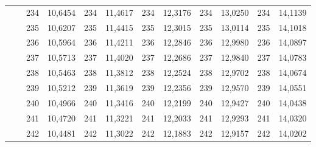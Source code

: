 \documentclass[a4paper,12pt]{article} %
\begin{document}
\begin{longtable}[c]{cccccccccc|c|c|}
	& \multicolumn{1}{c|}{} & \multicolumn{1}{c|}{234} & \multicolumn{1}{c|}{10,6454} & \multicolumn{1}{c|}{234} & \multicolumn{1}{c|}{11,4617} & \multicolumn{1}{c|}{234} & \multicolumn{1}{c|}{12,3176} & \multicolumn{1}{c|}{234} & 13,0250 & 234 & 14,1139 \\ \cline{3-12} 
	& \multicolumn{1}{c|}{} & \multicolumn{1}{c|}{235} & \multicolumn{1}{c|}{10,6207} & \multicolumn{1}{c|}{235} & \multicolumn{1}{c|}{11,4415} & \multicolumn{1}{c|}{235} & \multicolumn{1}{c|}{12,3015} & \multicolumn{1}{c|}{235} & 13,0114 & 235 & 14,1018 \\ \cline{3-12} 
	& \multicolumn{1}{c|}{} & \multicolumn{1}{c|}{236} & \multicolumn{1}{c|}{10,5964} & \multicolumn{1}{c|}{236} & \multicolumn{1}{c|}{11,4211} & \multicolumn{1}{c|}{236} & \multicolumn{1}{c|}{12,2846} & \multicolumn{1}{c|}{236} & 12,9980 & 236 & 14,0897 \\ \cline{3-12} 
	& \multicolumn{1}{c|}{} & \multicolumn{1}{c|}{237} & \multicolumn{1}{c|}{10,5713} & \multicolumn{1}{c|}{237} & \multicolumn{1}{c|}{11,4020} & \multicolumn{1}{c|}{237} & \multicolumn{1}{c|}{12,2686} & \multicolumn{1}{c|}{237} & 12,9840 & 237 & 14,0783 \\ \cline{3-12} 
	& \multicolumn{1}{c|}{} & \multicolumn{1}{c|}{238} & \multicolumn{1}{c|}{10,5463} & \multicolumn{1}{c|}{238} & \multicolumn{1}{c|}{11,3812} & \multicolumn{1}{c|}{238} & \multicolumn{1}{c|}{12,2524} & \multicolumn{1}{c|}{238} & 12,9702 & 238 & 14,0674 \\ \cline{3-12} 
	& \multicolumn{1}{c|}{} & \multicolumn{1}{c|}{239} & \multicolumn{1}{c|}{10,5212} & \multicolumn{1}{c|}{239} & \multicolumn{1}{c|}{11,3619} & \multicolumn{1}{c|}{239} & \multicolumn{1}{c|}{12,2356} & \multicolumn{1}{c|}{239} & 12,9570 & 239 & 14,0551 \\ \cline{3-12} 
	& \multicolumn{1}{c|}{} & \multicolumn{1}{c|}{240} & \multicolumn{1}{c|}{10,4966} & \multicolumn{1}{c|}{240} & \multicolumn{1}{c|}{11,3416} & \multicolumn{1}{c|}{240} & \multicolumn{1}{c|}{12,2199} & \multicolumn{1}{c|}{240} & 12,9427 & 240 & 14,0438 \\ \cline{3-12} 
	& \multicolumn{1}{c|}{} & \multicolumn{1}{c|}{241} & \multicolumn{1}{c|}{10,4720} & \multicolumn{1}{c|}{241} & \multicolumn{1}{c|}{11,3221} & \multicolumn{1}{c|}{241} & \multicolumn{1}{c|}{12,2033} & \multicolumn{1}{c|}{241} & 12,9293 & 241 & 14,0320 \\ \cline{3-12} 
	& \multicolumn{1}{c|}{} & \multicolumn{1}{c|}{242} & \multicolumn{1}{c|}{10,4481} & \multicolumn{1}{c|}{242} & \multicolumn{1}{c|}{11,3022} & \multicolumn{1}{c|}{242} & \multicolumn{1}{c|}{12,1883} & \multicolumn{1}{c|}{242} & 12,9157 & 242 & 14,0202 \\ \cline{3-12} 

\end{longtable}
\end{document}
